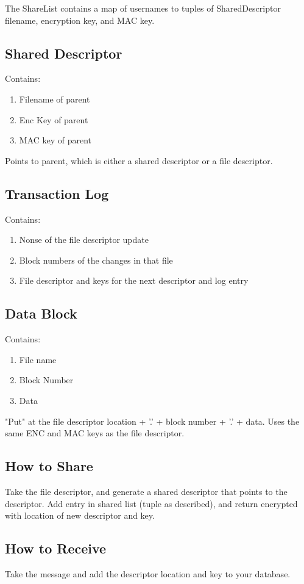 \documentclass{article}
\begin{document}
The ShareList contains a map of usernames to tuples of SharedDescriptor filename, encryption key, and MAC key.

\subsection{Shared Descriptor}
Contains:
\begin{enumerate}
\item Filename of parent
\item Enc Key of parent
\item MAC key of parent
\end{enumerate}
Points to parent, which is either a shared descriptor or a file descriptor.

\subsection{Transaction Log}
Contains:
\begin{enumerate}
\item Nonse of the file descriptor update
\item Block numbers of the changes in that file
\item File descriptor and keys for the next descriptor and log entry
\end{enumerate}

\subsection{Data Block}
Contains:
\begin{enumerate}
\item File name
\item Block Number
\item Data
\end{enumerate}
"Put" at the file descriptor location + '.' + block number + '.' + data.
Uses the same ENC and MAC keys as the file descriptor.

\subsection{How to Share}
Take the file descriptor, and generate a shared descriptor that points to the descriptor.
Add entry in shared list (tuple as described), and return encrypted with location of new descriptor and key.

\subsection{How to Receive}
Take the message and add the descriptor location and key to your database.
\end{document}
